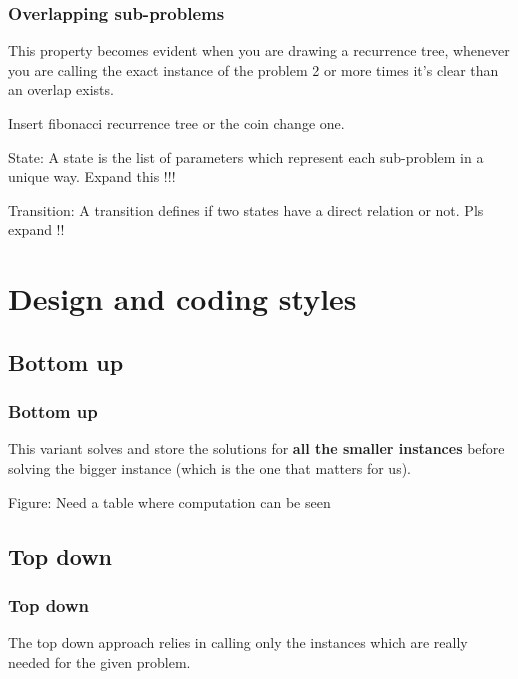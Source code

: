 \documentclass[article]{beamer}
\begin{document}
\begin{frame}
	\frametitle{Overlapping sub-problems}
	This property becomes evident when you are drawing a recurrence tree, whenever you are calling the exact instance of the problem 2 or more times it's clear than an overlap exists.
	
	\vspace{8mm}
	
	Insert fibonacci recurrence tree or the coin change one.	
\end{frame}

\begin{frame}
	\begin{block}{State:}
		A state is the list of parameters which represent each sub-problem in a unique way. Expand this !!!
	\end{block}
\end{frame}

\begin{frame}
	\begin{block}{Transition:}
		A transition defines if two states have a direct relation or not. Pls expand !!
	\end{block}
\end{frame}

\section{Design and coding styles}

\subsection{Bottom up}
\begin{frame}
	\frametitle{Bottom up}
	This variant solves and store the solutions for \textbf{all the smaller instances} before solving the bigger instance (which is the one that matters for us).
	
	\vspace{8mm}
	
	Figure: Need a table where computation can be seen
\end{frame}

\subsection{Top down}
\begin{frame}
	\frametitle{Top down}
	The top down approach relies in calling only the instances which are really needed for the given problem.
\end{frame}
\end{document}
